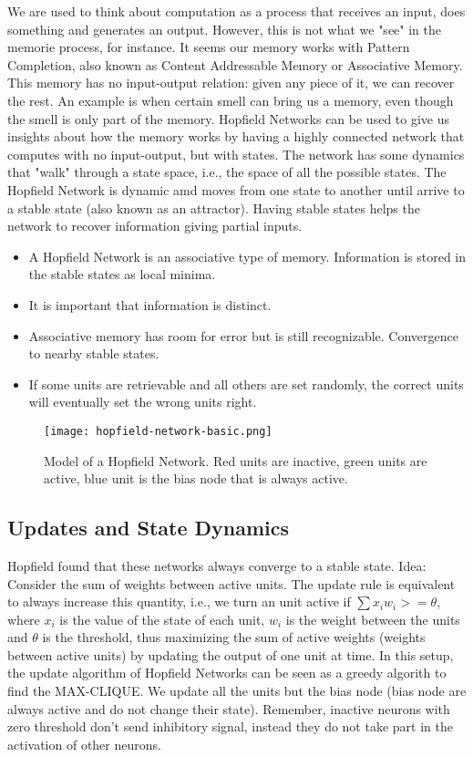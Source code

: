 \documentclass[main]{subfiles}
\begin{document}
We are used to think about computation as a process that receives an input, does something and generates an output.
However, this is not what we "see" in the memorie process, for instance.
It seems our memory works with Pattern Completion, also known as Content Addressable Memory or Associative Memory.
This memory has no input-output relation: given any piece of it, we can recover the rest.
An example is when certain smell can bring us a memory, even though the smell is only part of the memory.
Hopfield Networks can be used to give us insights about how the memory works by having a highly connected network that computes with no input-output, but with states.
The network has some dynamics that "walk" through a state space, i.e., the space of all the possible states. The Hopfield Network is dynamic amd moves from one state to another until arrive to a stable state (also known as an attractor). Having stable states helps the network to recover information giving partial inputs.


\begin{itemize}[noitemsep,nolistsep]
	\item A Hopfield Network is an associative type of memory. Information is stored in the stable states as local minima.
	\item It is important that information is distinct.
	\item Associative memory has room for error but is still recognizable. Convergence to nearby stable states.
	\item If some units are retrievable and all others are set randomly, the correct units will eventually set the wrong units right.
\end{itemize}

\begin{figure}[H]
	\centering
	\texttt{[image: hopfield-network-basic.png]}
	\caption{Model of a Hopfield Network. Red units are inactive, green units are active, blue unit is the bias node that is always active.}
\end{figure}

\subsection{Updates and State Dynamics}

Hopfield found that these networks always converge to a stable state.
Idea: Consider the sum of weights between active units.
The update rule is equivalent to always increase this quantity, i.e., we turn an unit active if $\sum x_i w_i >= \theta$, where $x_i$ is the value of the state of each unit, $w_i$ is the weight between the units and $\theta$ is the threshold, thus maximizing the sum of active weights (weights between active units) by updating the output of one unit at time.
In this setup, the update algorithm of Hopfield Networks can be seen as a greedy algorith to find the MAX-CLIQUE.
We update all the units but the bias node (bias node are always active and do not change their state).
Remember, inactive neurons with zero threshold don't send inhibitory signal, instead they do not take part in the activation of other neurons.
\end{document}
